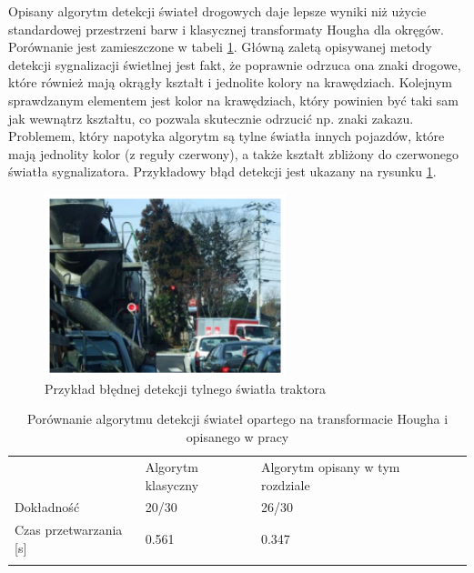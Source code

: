 Opisany algorytm detekcji świateł drogowych daje lepsze wyniki niż użycie standardowej przestrzeni barw i klasycznej transformaty Hougha dla okręgów. 
Porównanie jest zamieszczone w tabeli \ref{tab:tl_results}. 
Główną zaletą opisywanej metody detekcji sygnalizacji świetlnej jest fakt, że poprawnie odrzuca ona znaki drogowe, które również mają okrągły kształt i jednolite kolory na krawędziach. %
Kolejnym sprawdzanym elementem jest kolor na krawędziach, który powinien być taki sam jak wewnątrz kształtu, co pozwala skutecznie odrzucić np. znaki zakazu. %
Problemem, który napotyka algorytm są tylne światła innych pojazdów, które mają jednolity kolor (z reguły czerwony), a także kształt zbliżony do czerwonego światła sygnalizatora. %
Przykładowy błąd detekcji jest ukazany na rysunku \ref{fig:tl_err}.

\begin{figure}
  \centering
  \includegraphics[width=7cm]{img/tl_err.png}
  \caption{Przykład błędnej detekcji tylnego światła traktora\cite{T4}}
  \label{fig:tl_err}
\end{figure}

\begin{table}[]
\centering
\caption{Porównanie algorytmu detekcji świateł opartego na transformacie Hougha i opisanego w pracy\cite{T4}} %
\begin{tabular}{lllll}
\cline{1-3}
\multicolumn{1}{|l|}{}                           & \multicolumn{1}{l|}{Algorytm klasyczny} & \multicolumn{1}{l|}{Algorytm opisany w tym rozdziale} &  &  \\ \cline{1-3}
\multicolumn{1}{|l|}{Dokładność}                 & \multicolumn{1}{l|}{20/30}              & \multicolumn{1}{l|}{26/30}                            &  &  \\ \cline{1-3}
\multicolumn{1}{|l|}{Czas przetwarzania {[}s{]}} & \multicolumn{1}{l|}{0.561}              & \multicolumn{1}{l|}{0.347}                            &  &  \\ \cline{1-3}
                                                 &                                         &                                                       &  & 
\end{tabular}
\label{tab:tl_results}
\end{table}

